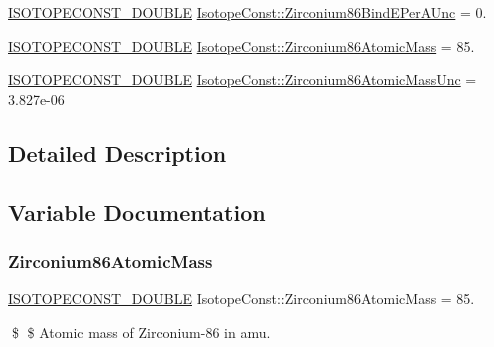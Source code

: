 \begin{DoxyCompactItemize}
\mbox{\hyperlink{group___isotope_const-_macros_ga8f45a7272ce02c0b4c65c44636ed719a}{I\+S\+O\+T\+O\+P\+E\+C\+O\+N\+S\+T\+\_\+\+D\+O\+U\+B\+LE}} \mbox{\hyperlink{group___isotope_const-_zirconium-_zr86_ga65456b99a9b0498e6bee10ad9d1bfb2c}{Isotope\+Const\+::\+Zirconium86\+Bind\+E\+Per\+A\+Unc}} = 0.
\item 
\mbox{\hyperlink{group___isotope_const-_macros_ga8f45a7272ce02c0b4c65c44636ed719a}{I\+S\+O\+T\+O\+P\+E\+C\+O\+N\+S\+T\+\_\+\+D\+O\+U\+B\+LE}} \mbox{\hyperlink{group___isotope_const-_zirconium-_zr86_ga0c3de7d88c44003ba522abf712a1e2c9}{Isotope\+Const\+::\+Zirconium86\+Atomic\+Mass}} = 85.
\item 
\mbox{\hyperlink{group___isotope_const-_macros_ga8f45a7272ce02c0b4c65c44636ed719a}{I\+S\+O\+T\+O\+P\+E\+C\+O\+N\+S\+T\+\_\+\+D\+O\+U\+B\+LE}} \mbox{\hyperlink{group___isotope_const-_zirconium-_zr86_gabf8d33d70dab448098dcad43c0e62f2c}{Isotope\+Const\+::\+Zirconium86\+Atomic\+Mass\+Unc}} = 3.\+827e-\/06
\end{DoxyCompactItemize}


\subsection{Detailed Description}


\subsection{Variable Documentation}
\mbox{\label{group___isotope_const-_zirconium-_zr86_ga0c3de7d88c44003ba522abf712a1e2c9}} 
\subsubsection{\texorpdfstring{Zirconium86\+Atomic\+Mass}{Zirconium86AtomicMass}}
{\footnotesize\ttfamily \mbox{\hyperlink{group___isotope_const-_macros_ga8f45a7272ce02c0b4c65c44636ed719a}{I\+S\+O\+T\+O\+P\+E\+C\+O\+N\+S\+T\+\_\+\+D\+O\+U\+B\+LE}} Isotope\+Const\+::\+Zirconium86\+Atomic\+Mass = 85.}

\$ \$ Atomic mass of Zirconium-\/86 in amu. \mbox{\label{group___isotope_const-_zirconium-_zr86_gabf8d33d70dab448098dcad43c0e62f2c}} 
